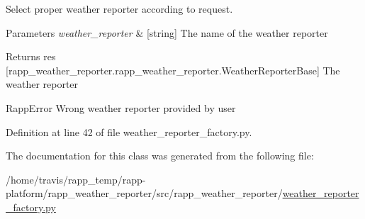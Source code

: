 Select proper weather reporter according to request. 


\begin{DoxyParams}{Parameters}
{\em weather\-\_\-reporter} & \mbox{[}string\mbox{]} The name of the weather reporter\\
\hline
\end{DoxyParams}
\begin{DoxyReturn}{Returns}
res \mbox{[}rapp\-\_\-weather\-\_\-reporter.\-rapp\-\_\-weather\-\_\-reporter.\-Weather\-Reporter\-Base\mbox{]} The weather reporter
\end{DoxyReturn}
Rapp\-Error Wrong weather reporter provided by user 

Definition at line 42 of file weather\-\_\-reporter\-\_\-factory.\-py.



The documentation for this class was generated from the following file\-:\begin{DoxyCompactItemize}
\item 
/home/travis/rapp\-\_\-temp/rapp-\/platform/rapp\-\_\-weather\-\_\-reporter/src/rapp\-\_\-weather\-\_\-reporter/\hyperlink{weather__reporter__factory_8py}{weather\-\_\-reporter\-\_\-factory.\-py}\end{DoxyCompactItemize}
